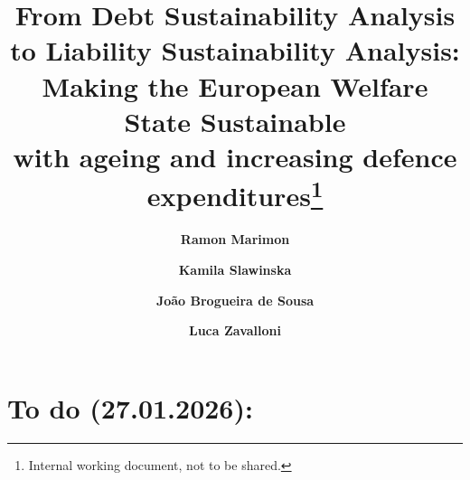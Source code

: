 \documentclass{article}
\newcommand{\redblue}{red!80!blue!}
\begin{document}
\title{\large\bf{\color{\redblue}
From Debt Sustainability Analysis to Liability Sustainability Analysis:\\
Making the European Welfare State Sustainable} \\{\color{gray}with ageing and increasing defence expenditures}\thanks{Internal working document, not to be shared.}}
\author{
{\small\bf\color{blue}Ramon Marimon}
\and
{\small\bf\color{blue}Kamila Slawinska}
\and
{\small\bf\color{blue}Jo\~ao Brogueira de Sousa}
\and
{\small\bf\color{blue}Luca Zavalloni}}

\maketitle

\section*{To do (27.01.2026):}
\end{document}
